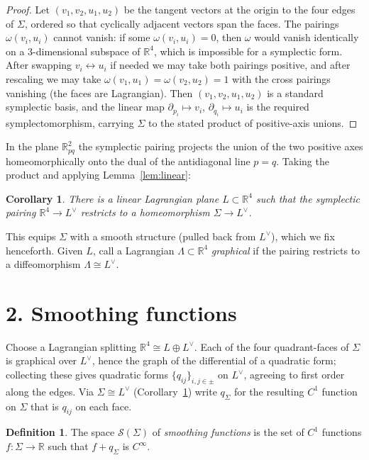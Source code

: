 \documentclass[11pt]{article}
\newcommand{\R}{\mathbb{R}}
\newcommand{\Sm}{\mathscr S}
\newcommand{\Ldual}{L^{\vee}}
\newcommand{\Lag}{\Lambda}
\newtheorem{corollary}{Corollary}
\theoremstyle{definition}
\newtheorem{definition}{Definition}
\begin{document}
\begin{proof}
Let $(v_1,v_2,u_1,u_2)$ be the tangent vectors at the origin to the four edges of
$\Sigma$, ordered so that cyclically adjacent vectors span the faces. The
pairings $\omega(v_i,u_i)$ cannot vanish: if some $\omega(v_i,u_i)=0$, then
$\omega$ would vanish identically on a $3$-dimensional subspace of $\R^4$, which
is impossible for a symplectic form. After swapping $v_i\leftrightarrow u_i$ if
needed we may take both pairings positive, and after rescaling we may take
$\omega(v_1,u_1)=\omega(v_2,u_2)=1$ with the cross pairings vanishing (the faces
are Lagrangian). Then $(v_1,v_2,u_1,u_2)$ is a standard symplectic basis, and the
linear map $\partial_{p_i}\mapsto v_i$, $\partial_{q_i}\mapsto u_i$ is the
required symplectomorphism, carrying $\Sigma$ to the stated product of
positive-axis unions.
\end{proof}

In the plane $\R^2_{pq}$ the symplectic pairing projects the union of the two
positive axes homeomorphically onto the dual of the antidiagonal line $p=q$.
Taking the product and applying Lemma~\ref{lem:linear}:

\begin{corollary}\label{cor:Ldual}
There is a linear Lagrangian plane $L\subset\R^4$ such that the symplectic
pairing $\R^4\to \Ldual$ restricts to a homeomorphism $\Sigma\to \Ldual$.
\end{corollary}

This equips $\Sigma$ with a smooth structure (pulled back from $\Ldual$), which
we fix henceforth. Given $L$, call a Lagrangian $\Lag\subset\R^4$
\emph{graphical} if the pairing restricts to a diffeomorphism $\Lag\cong\Ldual$.

\section*{2. Smoothing functions}

Choose a Lagrangian splitting $\R^4\cong L\oplus\Ldual$. Each of the four
quadrant-faces of $\Sigma$ is graphical over $\Ldual$, hence the graph of the
differential of a quadratic form; collecting these gives quadratic forms
$\{q_{ij}\}_{i,j\in\pm}$ on $\Ldual$, agreeing to first order along the edges.
Via $\Sigma\cong\Ldual$ (Corollary~\ref{cor:Ldual}) write $q_\Sigma$ for the
resulting $C^1$ function on $\Sigma$ that is $q_{ij}$ on each face.

\begin{definition}\label{def:smoothing}
The space $\Sm(\Sigma)$ of \emph{smoothing functions} is the set of $C^1$
functions $f:\Sigma\to\R$ such that $f+q_\Sigma$ is $C^\infty$.
\end{definition}
\end{document}
